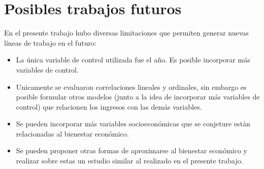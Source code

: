 \chapter{Posibles trabajos futuros} \label{chapter:trabajos_futuros}

En el presente trabajo hubo diversas limitaciones que permiten generar nuevas líneas de trabajo en el futuro:

\begin{itemize}
    \item La única variable de control utilizada fue el año. Es posible incorporar más variables de control.
    \item Unicamente se evaluaron correlaciones lineales y ordinales, sin embargo es posible formular otros modelos (junto a la idea de incorporar más variables de control) que relacionen los ingresos con las demás variables.
    \item Se pueden incorporar más variables socioeconómicas que se conjeture están relacionadas al bienestar económico.
    \item Se pueden proponer otras formas de aproximarse al bienestar económico y realizar sobre estas un estudio similar al realizado en el presente trabajo.
\end{itemize}

